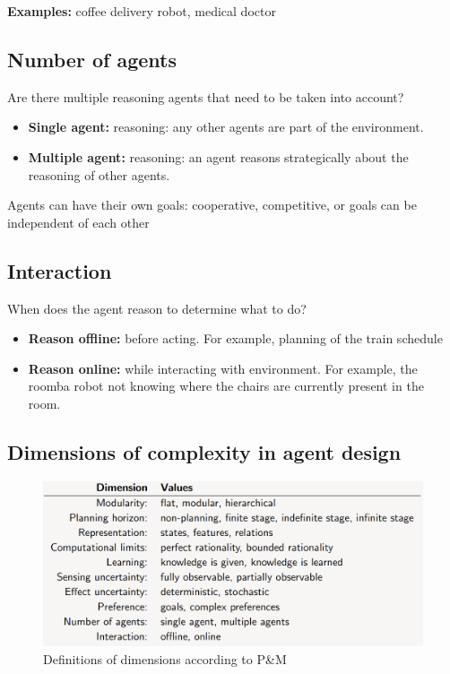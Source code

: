 \documentclass[12pt]{article}
\begin{document}
\noindent \textbf{Examples:} coffee delivery robot, medical doctor

\subsection*{Number of agents}
Are there multiple reasoning agents that need to be taken into account?

\begin{itemize}
    \item \textbf{Single agent:} reasoning: any other agents are part of the environment.
    \item \textbf{Multiple agent:} reasoning: an agent reasons strategically about the reasoning of other
agents.
\end{itemize}

\noindent Agents can have their own goals: cooperative, competitive, or goals can be independent of
each other

\subsection*{Interaction}
When does the agent reason to determine what to do?

\begin{itemize}
    \item \textbf{Reason offline:} before acting. For example, planning of the train schedule
    \item \textbf{Reason online:} while interacting with environment. For example, the roomba robot not knowing where the chairs are currently present in the room.
\end{itemize}

\newpage
\subsection*{Dimensions of complexity in agent design}

\begin{figure}[h!]
        \centering
        \includegraphics[scale=0.4]{definition-dimensions.png}
        \caption{Definitions of dimensions according to P\&M}
        \label{fig:my_label}
\end{figure}
\end{document}
